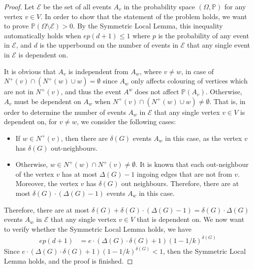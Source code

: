 \begin{proof}
  Let $\mathcal{E}$ be the set of all events $A_{v}$ in the probability space $(\Omega, \mathbb{P})$ for any vertex $v \in V$. In order to show that the statement of the problem holds, we want to prove $\mathbb{P}(\Omega \setminus \mathcal{E}) > 0$. By the Symmetric Local Lemma, this inequality automatically holds when $ep(d+1) \leq 1$ where $p$ is the probability of any event in $\mathcal{E}$, and $d$ is the upperbound on the number of events in $\mathcal{E}$ that any single event in $\mathcal{E}$ is dependent on. 

  It is obvious that $A_{v}$ is independent from $A_{w}$, where $v \neq w$, in case of $N^{+}(v) \cap \left( N^{+}(w) \cup w \right) = \emptyset$ since $A_{w}$ only affects colouring of vertices which are not in $N^{+}(v)$, and thus the event $A^{w}$ does not affect $\mathbb{P}(A_{v})$. Otherwise, $A_{v}$ must be dependent on $A_{w}$ when $N^{+}(v) \cap \left( N^{+}(w) \cup w \right) \neq \emptyset$. That is, in order to determine the number of events $A_{w}$ in $\mathcal{E}$ that any single vertex $v \in V$ is dependent on, for $v \neq w$, we consider the following cases:
  \begin{itemize}
    \item If $w \in N^{+}(v)$, then there are $\delta(G)$ events $A_{w}$ in this case, as the vertex $v$ has $\delta(G)$ out-neighbours.
    \item Otherwise, $w \in N^{+}(w) \cap N^{+}(v) \neq \emptyset$. It is known that each out-neighbour of the vertex $v$ has at most $\Delta(G)-1$ ingoing edges that are not from $v$. Moreover, the vertex $v$ has $\delta(G)$ out neighbours. Therefore, there are at most $\delta(G) \cdot (\Delta(G)-1)$ events $A_{w}$ in this case.
  \end{itemize}
  Therefore, there are at most $\delta(G) + \delta(G) \cdot (\Delta(G)-1) = \delta(G) \cdot \Delta(G)$ events $A_{w}$ in $\mathcal{E}$ that any single vertex $v \in V$ that is dependent on. We now want to verify whether the Symmetric Local Lemma holds, we have
  \begin{align*}
    ep(d+1) &= e \cdot (\Delta(G) \cdot \delta(G) + 1)(1-1/k)^{\delta(G)}
  \end{align*}
  Since $e \cdot (\Delta(G) \cdot \delta(G) + 1)(1-1/k)^{\delta(G)} < 1$, then the Symmetric Local Lemma holds, and the proof is finished.
\end{proof}
